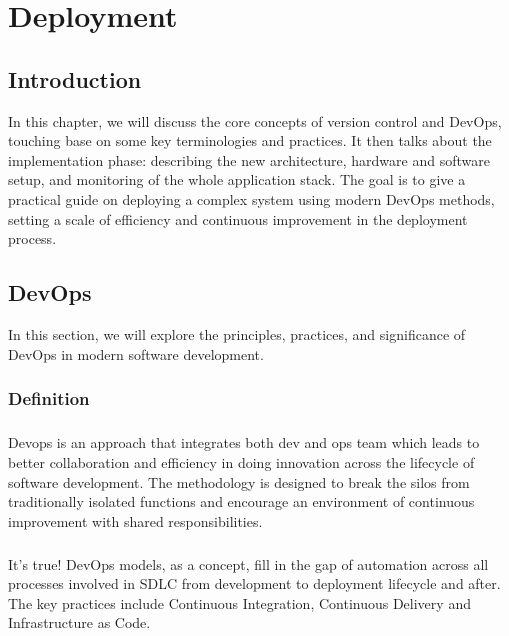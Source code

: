 \chapter{Deployment}


\setcounter{secnumdepth}{0} %
\section{Introduction}
In this chapter, we will discuss the core concepts of version control and DevOps, touching base on some key terminologies and practices. It then talks about the implementation phase: describing the new architecture, hardware and software setup, and monitoring of the whole application stack.
\newline
The goal is to give a practical guide on deploying a complex system using modern DevOps methods, setting a scale of efficiency and continuous improvement in the deployment process.

\setcounter{secnumdepth}{2} 
\section{DevOps}
In this section, we will explore the principles, practices, and significance of DevOps in modern software development.
\subsection{Definition}
\paragraph*{}
Devops is an approach that integrates both dev and ops team which leads to better collaboration and efficiency in doing innovation across the lifecycle of software development.
\newline
The methodology is designed to break the silos from traditionally isolated functions and encourage an environment of continuous improvement with shared responsibilities.
\paragraph*{}
It’s true! DevOps models, as a concept, fill in the gap of automation across all processes involved in SDLC from development to deployment lifecycle and after. The key practices include Continuous Integration, Continuous Delivery and Infrastructure as Code.

